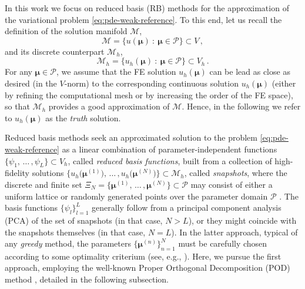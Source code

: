 \documentclass[12pt, a4paper, twoside, openright, notitlepage]{report}
\numberwithin{equation}{chapter}
\theoremstyle{theorem}
\theoremstyle{definition}
\theoremstyle{remark}
\theoremstyle{proposition}
\numberwithin{figure}{chapter}
\newcommand{\bg}[1]{\boldsymbol{#1}}
\begin{document}
		In this work we focus on reduced basis (RB) methods for the approximation of the variational problem \eqref{eq:pde-weak-reference}. To this end, let us recall the definition of the solution manifold $\mathcal{M}$,
		\begin{equation*}
			\mathcal{M} = \big\lbrace u(\bg{\mu}) ~ : ~ \bg{\mu} \in \mathcal{P} \big\rbrace \subset V \, ,
		\end{equation*}
		and its discrete counterpart $\mathcal{M}_h$,
		\begin{equation*}
			\mathcal{M}_h = \big\lbrace u_h(\bg{\mu}) ~ : ~ \bg{\mu} \in \mathcal{P} \big\rbrace \subset V_h \, .
		\end{equation*}
		For any $\bg{\mu} \in \mathcal{P}$, we assume that the FE solution $u_h(\bg{\mu})$ can be lead as close as desired (in the $V$-norm) to the corresponding continuous solution $u_h(\bg{\mu})$ (either by refining the computational mesh or by increasing the order of the FE space), so that $\mathcal{M}_h$ provides a good approximation of $\mathcal{M}$. Hence, in the following we refer to $u_h(\bg{\mu})$ as the \emph{truth} solution.
		
		Reduced basis methods seek an approximated solution to the problem \eqref{eq:pde-weak-reference} as a linear combination of parameter-independent functions $\big\lbrace \psi_1, \, \ldots \, , \psi_L \big\rbrace \subset V_h$, called \emph{reduced basis functions}, built from a collection of high-fidelity solutions $\big\lbrace u_h \big( \bg{\mu}^{(1)} \big), \, \ldots \, , u_h \big( \bg{\mu}^{(N)} \big) \big\rbrace \subset \mathcal{M}_h$, called \emph{snapshots}, where the discrete and finite set $\Xi_N = \big\lbrace \bg{\mu}^{(1)}, \, \ldots \, , \bg{\mu}^{(N)} \big\rbrace \subset \mathcal{P}$ may consist of either a uniform lattice or randomly generated points over the parameter domain $\mathcal{P}$ \cite{HSR16}. The basis functions $\big\lbrace \psi_l \big\rbrace_{l = 1}^L$ generally follow from a principal component analysis (PCA) of the set of snapshots (in that case, $N > L$), or they might coincide with the snapshots themselves (in that case, $N = L$). In the latter approach, typical of any \emph{greedy} method, the parameters $\big\lbrace \bg{\mu}^{(n)} \big\rbrace_{n = 1}^N$ must be carefully chosen according to some optimality criterium (see, e.g., \cite{Chen17}). Here, we pursue the first approach, employing the well-known Proper Orthogonal Decomposition (POD) method \cite{Vol08}, detailed in the following subsection.
		
\end{document}
